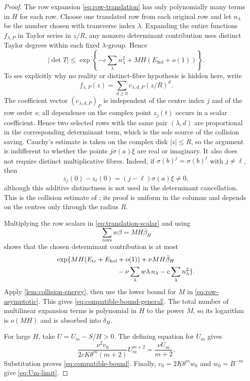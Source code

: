 \documentclass[11pt]{article}
\theoremstyle{definition}
\theoremstyle{remark}
\numberwithin{equation}{section}
\begin{document}
\begin{proof}
The row expansion \eqref{eq:row-translation} has only polynomially many
terms in $H$ for each row.  Choose one translated row from each original
row and let $n_\lambda$ be the number chosen with transverse index
$\lambda$.  Expanding the entire functions $f_{\lambda,P}$ in Taylor
series in $z/R$, any nonzero determinant contribution uses distinct
Taylor degrees within each fixed $\lambda$-group.  Hence
\begin{equation}\label{eq:collision-term}
 |\det T|
 \le\exp\left\{-c\sum_\lambda n_\lambda^2
 +MH(E_{\mathrm{hol}}+o(1))\right\}.
\end{equation}
To see explicitly why no reality or distinct-fibre hypothesis is hidden
here, write
\[
 f_{\lambda,P}(z)=\sum_{d\ge0}c_{\lambda,d,P}(z/R)^d.
\]
The coefficient vector $(c_{\lambda,d,P})_P$ is independent of the
centre index $j$ and of the row order $s$; all dependence on the complex
point $z_j(t)$ occurs in a scalar coefficient.  Hence two selected rows
with the same pair $(\lambda,d)$ are proportional in the corresponding
determinant term, which is the sole source of the collision saving.
Cauchy's estimate is taken on the complex disk $|z|\le R$, so the
argument is indifferent to whether the points $j\sigma(a)\xi$ are real
or imaginary.  It also does not require distinct multiplicative fibres.
Indeed, if $\sigma(b)^j=\sigma(b)^\ell$ with $j\ne\ell$, then
\[
 z_j(0)-z_\ell(0)=(j-\ell)\sigma(a)\xi\ne0,
\]
although this additive distinctness is not used in the determinant
cancellation.  This is the collision estimate of
\cite[Section~5.2]{LiuJiangZhang2026}; its proof is uniform in the
columns and depends on the centres only through the radius $R$.

Multiplying the row scalars in \eqref{eq:translation-scalar} and using
\[
 \sum_{\text{rows}}w\beta=MH\bar\beta_H
\]
shows that the chosen determinant contribution is at most
\begin{align*}
 \exp\{&MH(E_{\mathrm{tr}}+E_{\mathrm{hol}}+o(1))
       +\nu MH\bar\beta_H\\
      &\hspace{24mm}
       -\nu\sum_\lambda w\lambda\,n_\lambda
       -c\sum_\lambda n_\lambda^2\}.
\end{align*}
Apply \cref{lem:collision-energy}, then use the lower bound for $M$ in
\eqref{eq:row-asymptotic}.  This gives
\eqref{eq:compatible-bound-general}.  The total number of multilinear
expansion terms is polynomial in $H$ to the power $M$, so its logarithm
is $o(MH)$ and is absorbed into $\delta_H$.

For large $H$, take $U=U_m-S/H>0$.  The defining equation for $U_m$
gives
\[
 \frac{\nu^2v_0}{2cK\theta^m(m+2)}U_m^{m+2}
 =\frac{\nu U_m}{m+2}.
\]
Substitution proves \eqref{eq:compatible-bound}.  Finally,
$v_0=2K\theta^mw_0$ and $w_0=B^{-m}$ give
\eqref{eq:Um-limit}.
\end{proof}
\end{document}
